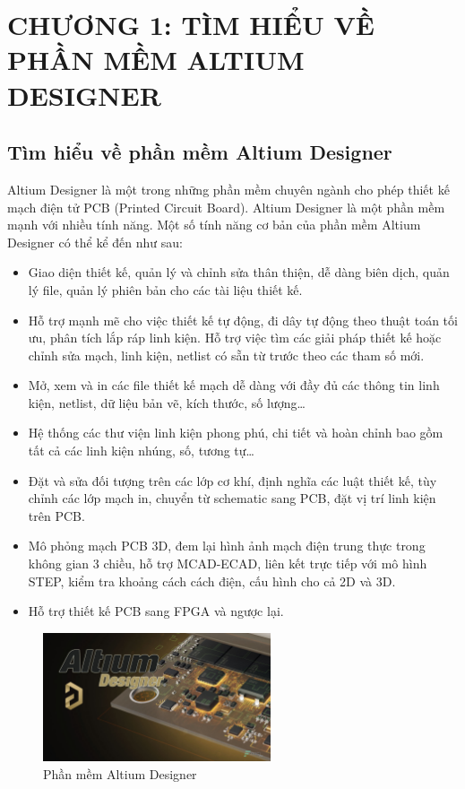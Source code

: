 \documentclass{article}
\begin{document}
\tableofcontents %
\thispagestyle{empty}
\cleardoublepage

\section*{CHƯƠNG 1: TÌM HIỂU VỀ PHẦN MỀM ALTIUM DESIGNER}
\subsection{Tìm hiểu về phần mềm Altium Designer}
Altium Designer là một trong những phần mềm chuyên ngành cho phép thiết kế mạch điện tử PCB (Printed Circuit Board). Altium Designer là một phần mềm mạnh với nhiều tính năng. Một số tính năng cơ bản của phần mềm Altium Designer có thể kể đến như sau:
\begin{itemize}
    \item Giao diện thiết kế, quản lý và chỉnh sửa thân thiện, dễ dàng biên dịch, quản lý file, quản lý phiên bản cho các tài liệu thiết kế.
    \item Hỗ trợ mạnh mẽ cho việc thiết kế tự động, đi dây tự động theo thuật toán tối ưu, phân tích lắp ráp linh kiện. Hỗ trợ việc tìm các giải pháp thiết kế hoặc chỉnh sửa mạch, linh kiện, netlist có sẵn từ trước theo các tham số mới.
    \item Mở, xem và in các file thiết kế mạch dễ dàng với đầy đủ các thông tin linh kiện, netlist, dữ liệu bản vẽ, kích thước, số lượng…
    \item Hệ thống các thư viện linh kiện phong phú, chi tiết và hoàn chỉnh bao gồm tất cả các linh kiện nhúng, số, tương tự…
    \item Đặt và sửa đối tượng trên các lớp cơ khí, định nghĩa các luật thiết kế, tùy chỉnh các lớp mạch in, chuyển từ schematic sang PCB, đặt vị trí linh kiện trên PCB.
    \item Mô phỏng mạch PCB 3D, đem lại hình ảnh mạch điện trung thực trong không gian 3 chiều, hỗ trợ MCAD-ECAD, liên kết trực tiếp với mô hình STEP, kiểm tra khoảng cách cách điện, cấu hình cho cả 2D và 3D.
    \item Hỗ trợ thiết kế PCB sang FPGA và ngược lại.
\end{itemize}
\begin{figure}[H]
    \centering
    \includegraphics[width=0.6\textwidth]{image/altium.png}
    \caption{Phần mềm Altium Designer}
    \label{fig:altium}
\end{figure}
\cleardoublepage
\end{document}
